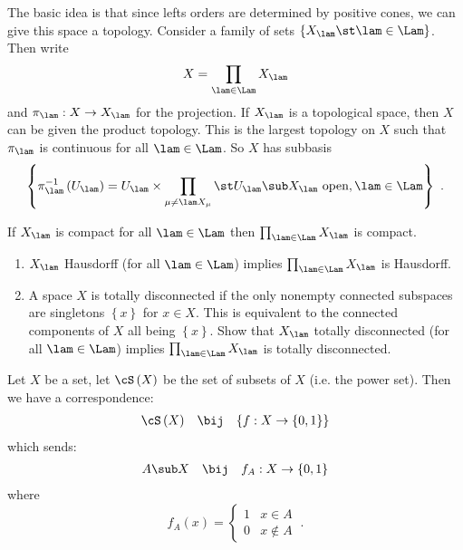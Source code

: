 The basic idea is that since lefts orders are determined by positive cones, we can give
this space a topology. Consider a family of sets
$\left\{X_\lam \st \lam \in \Lam\right\}$.
Then write
\begin{equation*}
X = \prod_{\lam \in \Lam} X_\lam
\end{equation*}
and $\pi_\lam : X\to X_\lam$ for the projection. 
If $X_\lam$ is a topological space, then $X$ can be given the product topology. This is
the largest topology on $X$ such that $\pi_\lam$ is continuous for all $\lam \in \Lam$.
So $X$ has subbasis
\begin{equation}
\left\{\pi_\lam^{-1}\left(U_\lam\right) = U_\lam \times \prod_{\mu\neq \lam X_\mu}
\st U_\lam\sub X_\lam \text{ open}, \lam\in \Lam\right\}
\ .
\end{equation}

\begin{thm*}
If $X_\lam$ is compact for all $\lam \in \Lam$
then $\prod_{\lam \in \Lam} X_\lam$ is compact.
\end{thm*}

\begin{rmk}[Exercises]
\begin{enumerate}
\item $X_\lam$ Hausdorff (for all $\lam \in \Lam$) implies $\prod_{\lam \in \Lam} X_\lam$ is
Hausdorff.
\item A space $X$ is totally disconnected if the only nonempty connected subspaces are
singletons $\left\{x\right\}$ for $x\in X$.
This is equivalent to the connected components of $X$ all being $\left\{x\right\}$.
Show that $X_\lam$ totally disconnected (for all $\lam \in \Lam$)
implies $\prod_{\lam \in \Lam} X_\lam$ is totally disconnected.
\end{enumerate}
\end{rmk}

Let $X$ be a set, let $\cS\left(X\right)$ be the set of subsets of $X$ (i.e. the power
set). Then we have a correspondence:
\begin{align*}
\cS\left(X\right) && \bij && \left\{f : X\to \left\{0,1\right\}\right\}\\
\end{align*}
which sends:
\begin{align*}
A\sub X && \bij && f_A : X\to \left\{0,1\right\}
\end{align*}
where
\begin{equation*}
f_A\left(x\right) = 
\begin{cases}
1 & x\in A \\ 
0 & x\not \in A
\end{cases}
\ .
\end{equation*}

